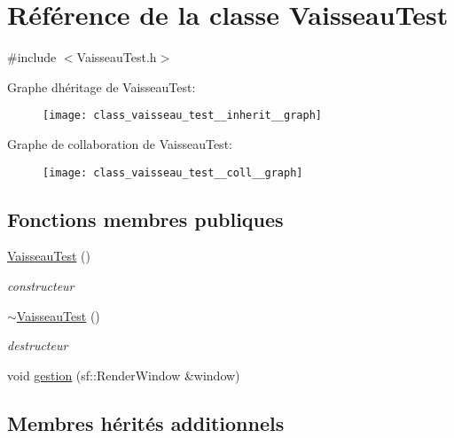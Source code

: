 \hypertarget{class_vaisseau_test}{}\section{Référence de la classe Vaisseau\+Test}
\label{class_vaisseau_test}


{\ttfamily \#include $<$Vaisseau\+Test.\+h$>$}



Graphe d\textquotesingle{}héritage de Vaisseau\+Test\+:\nopagebreak
\begin{figure}[H]
\begin{center}
\leavevmode
\texttt{[image: class\_vaisseau\_test\_\_inherit\_\_graph]}
\end{center}
\end{figure}


Graphe de collaboration de Vaisseau\+Test\+:\nopagebreak
\begin{figure}[H]
\begin{center}
\leavevmode
\texttt{[image: class\_vaisseau\_test\_\_coll\_\_graph]}
\end{center}
\end{figure}
\subsection*{Fonctions membres publiques}
\begin{DoxyCompactItemize}
\item 
\hyperlink{class_vaisseau_test_acbe01fc8952d9c6fd52cbf311a92c903}{Vaisseau\+Test} ()
\begin{DoxyCompactList}\small\item\em constructeur \end{DoxyCompactList}\item 
\hyperlink{class_vaisseau_test_ada9b5788bc092ecede953248cd6133e8}{$\sim$\+Vaisseau\+Test} ()
\begin{DoxyCompactList}\small\item\em destructeur \end{DoxyCompactList}\item 
void \hyperlink{class_vaisseau_test_acf5f5ea1e9317cbc5a4c445016cd767c}{gestion} (sf\+::\+Render\+Window \&window)
\end{DoxyCompactItemize}
\subsection*{Membres hérités additionnels}


